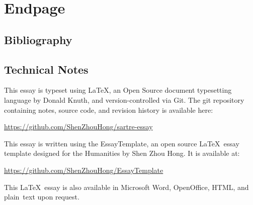 \chapter{Endpage}

\section*{Bibliography}
\nocite{*}
\printbibliography[heading=none]

\section*{Technical Notes}
This essay is typeset using \LaTeX, an Open Source document typesetting language
by Donald Knuth, and version-controlled via Git. The git repository containing notes, source code, and revision history is available here:

\url{https://github.com/ShenZhouHong/sartre-essay}

\noindent
This essay is written using the EssayTemplate, an open source \LaTeX\ essay
template designed for the Humanities by Shen Zhou Hong. It is available at:

\url{https://github.com/ShenZhouHong/EssayTemplate}

\vfill
\begin{center}
This \LaTeX\ essay is also available in Microsoft Word, OpenOffice, HTML, and \mbox{plain text} upon request.
\end{center}
